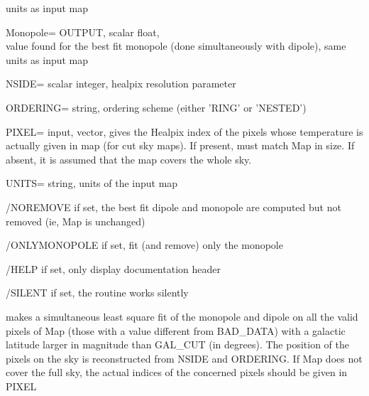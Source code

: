 \begin{qualifiers}
\begin{qulist}{}
        units as input map
    \item[Monopole=]  
        OUTPUT, scalar float, \\
        value found for the best fit monopole (done simultaneously with dipole),
        same units as input map
    \item[NSIDE=]  
    scalar integer, healpix resolution parameter
    \item[ORDERING=]  
    string, ordering scheme (either 'RING' or 'NESTED')
    \item[PIXEL=]  
    input, vector, gives the Healpix index of the pixels
        whose temperature is actually given in map (for cut sky
    maps). If present, must match Map in size. If absent, it is
    assumed that the map covers the whole sky.
    \item[UNITS=]  
   string, units of the input map
  \end{qulist}
\end{qualifiers}

\begin{keywords}
  \begin{kwlist}{} %
    \item[/NOREMOVE]  
   if set, the best fit dipole and monopole are computed but not
    removed (ie, Map is unchanged)
    \item[/ONLYMONOPOLE]  
   if set, fit (and remove) only the monopole
    \item[/HELP]  
    if set, only display documentation header
    \item[/SILENT]  
    if set, the routine works silently
  \end{kwlist}
\end{keywords}  

\begin{codedescription}
{\facname makes a simultaneous least square fit of the monopole and dipole on all the valid
pixels of Map (those with a value different from BAD\_DATA) with a galactic
latitude larger in magnitude than GAL\_CUT (in degrees). The position of the pixels
on the sky is reconstructed from NSIDE and ORDERING.
If Map does not cover the full sky, the actual indices of the concerned pixels should be given in PIXEL}
\end{codedescription}



